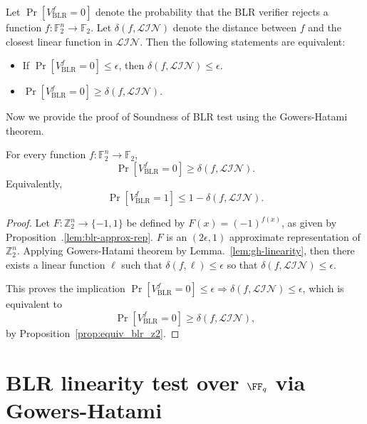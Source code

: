 \begin{proposition}\label{prop:equiv_blr_z2}
    Let $ \Pr[V_{\text{BLR}}^f=0]$ denote the probability that the BLR verifier rejects a function $f: \mathbb{F}_2^n \to \mathbb{F}_2$.
    Let $\delta(f, \mathcal{LIN})$ denote the distance between $f$ and the closest linear function in $\mathcal{LIN}$.
    Then the following statements are equivalent:
    \begin{itemize}
        \item If $\Pr[V_{\text{BLR}}^f=0] \leq \epsilon$, then $\delta(f, \mathcal{LIN}) \leq \epsilon$.
        \item $\Pr[V_{\text{BLR}}^f=0] \geq \delta(f, \mathcal{LIN})$.
    \end{itemize}
\end{proposition}    


Now we provide the proof of Soundness of BLR test using the Gowers-Hatami theorem.

\begin{theorem}
\label{thm:z2-blr-soundness}
For every function $f:\mathbb{F}_2^n\to\mathbb{F}_2$,
\[
    \Pr[V_{\text{BLR}}^f=0] \ge \delta(f,\mathcal{LIN}).
\]
Equivalently,
\[
    \Pr[V_{\text{BLR}}^f=1] \le 1-\delta(f,\mathcal{LIN}).
\]
\end{theorem}

\begin{proof}
    Let $F: \mathbb{Z}_2^n \to \{-1,1\}$ be defined by $F(x)=(-1)^{f(x)}$, as given by Proposition~.\ref{lem:blr-approx-rep}.
    $F$ is an $(2\epsilon,1)$ approximate representation of $\mathbb{Z}_2^n$.
    Applying Gowers-Hatami theorem by Lemma.~\ref{lem:gh-linearity},
    then there exists a linear function $\ell$ such that $\delta(f, \ell) \leq \epsilon$ so that $\delta(f,\mathcal{LIN})\le \epsilon$.

    This proves the implication 
    $\Pr[V_{\text{BLR}}^f=0]\le \epsilon \Rightarrow \delta(f,\mathcal{LIN})\le \epsilon$,
    which is equivalent to
    \[
        \Pr[V_{\text{BLR}}^f=0]\ge \delta(f,\mathcal{LIN}),
    \]
     by Proposition~\ref{prop:equiv_blr_z2}.
\end{proof}

\section{BLR linearity test over $\FF_q$ via Gowers-Hatami}\label{sec:blr-finite-field}

